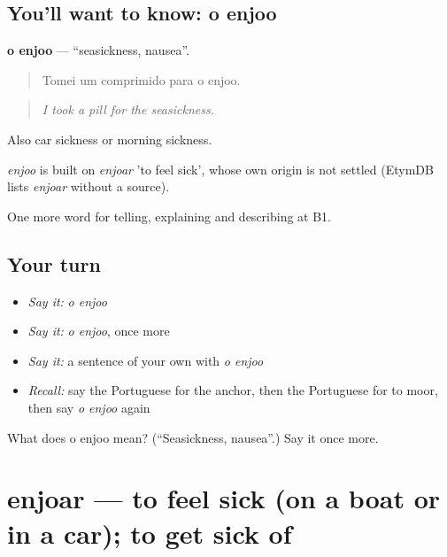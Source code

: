 \subsection*{You'll want to know: o enjoo}
\textbf{o enjoo} — \textquotedblleft{}seasickness, nausea\textquotedblright{}.

\begin{quote}
Tomei um comprimido para o enjoo.
\end{quote}

\begin{quote}
\emph{I took a pill for the seasickness.}
\end{quote}

Also car sickness or morning sickness.

\begin{cousinweb}
\emph{enjoo} is built on \emph{enjoar} 'to feel sick', whose own origin is not settled (EtymDB lists \emph{enjoar} without a source).
\end{cousinweb}

\begin{grammarlens}[title={What you've built}]
One more word for telling, explaining and describing at B1.
\end{grammarlens}

\subsection*{Your turn}
\begin{itemize}
\raggedright
  \item \emph{Say it:} \emph{o enjoo}
  \item \emph{Say it:} \emph{o enjoo}, once more
  \item \emph{Say it:} a sentence of your own with \emph{o enjoo}
  \item \emph{Recall:} say the Portuguese for the anchor, then the Portuguese for to moor, then say \emph{o enjoo} again
\end{itemize}

\begin{tcolorbox}[breakable,colback=teal!4,colframe=teal!35!black,title={Before you move on}]
What does o enjoo mean? (\textquotedblleft{}Seasickness, nausea\textquotedblright{}.) Say it once more.
\end{tcolorbox}
\section[enjoar]{enjoar — to feel sick (on a boat or in a car); to get sick of}

